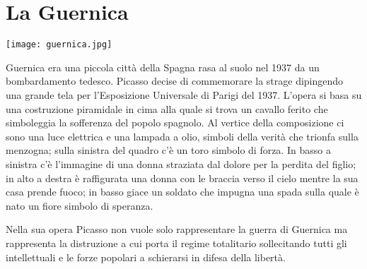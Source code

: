 \section{La Guernica}

\noindent
\texttt{[image: guernica.jpg]}

Guernica era una piccola città della Spagna rasa al suolo nel 1937 da un bombardamento tedesco. Picasso decise di commemorare la strage dipingendo una grande tela per l'Esposizione Universale di Parigi del 1937. L'opera si basa su una costruzione piramidale in cima alla quale si trova un cavallo ferito che simboleggia la sofferenza del popolo spagnolo. Al vertice della composizione ci sono una luce elettrica e una lampada a olio, simboli della verità che trionfa sulla menzogna; sulla sinistra del quadro c'è un toro simbolo di forza. In basso a sinistra c'è l'immagine di una donna straziata dal dolore per la perdita del figlio; in alto a destra è raffigurata una donna con le braccia verso il cielo mentre la sua casa prende fuoco; in basso giace un soldato che impugna una spada sulla quale è nato un fiore simbolo di speranza.

Nella sua opera Picasso non vuole solo rappresentare la guerra di Guernica ma rappresenta la distruzione a cui porta il regime totalitario sollecitando tutti gli intellettuali e le forze popolari a schierarsi in difesa della libertà.
